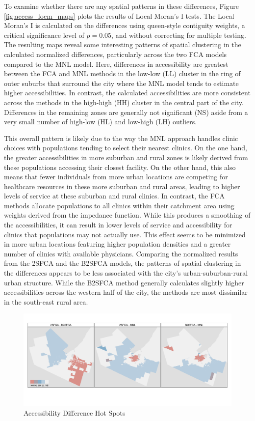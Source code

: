 \documentclass[]{elsarticle} %
\begin{document}
To examine whether there are any spatial patterns in these differences,
Figure \ref{fig:access_locm_maps} plots the results of Local Moran's I
tests. The Local Moran's I is calculated on the differences using
queen-style contiguity weights, a critical significance level of
\(p=0.05\), and without correcting for multiple testing. The resulting
maps reveal some interesting patterns of spatial clustering in the
calculated normalized differences, particularly across the two FCA
models compared to the MNL model. Here, differences in accessibility are
greatest between the FCA and MNL methods in the low-low (LL) cluster in
the ring of outer suburbs that surround the city where the MNL model
tends to estimate higher accessibilities. In contrast, the calculated
accessibilities are more consistent across the methods in the high-high
(HH) cluster in the central part of the city. Differences in the
remaining zones are generally not significant (NS) aside from a very
small number of high-low (HL) and low-high (LH) outliers.

This overall pattern is likely due to the way the MNL approach handles
clinic choices with populations tending to select their nearest clinics.
On the one hand, the greater accessibilities in more suburban and rural
zones is likely derived from these populations accessing their closest
facility. On the other hand, this also means that fewer individuals from
more urban locations are competing for healthcare resources in these
more suburban and rural areas, leading to higher levels of service at
these suburban and rural clinics. In contrast, the FCA methods allocate
populations to all clinics within their catchment area using weights
derived from the impedance function. While this produces a smoothing of
the accessibilities, it can result in lower levels of service and
accessibility for clinics that populations may not actually use. This
effect seems to be minimized in more urban locations featuring higher
population densities and a greater number of clinics with available
physicians. Comparing the normalized results from the 2SFCA and the
B2SFCA models, the patterns of spatial clustering in the differences
appears to be less associated with the city's urban-suburban-rural urban
structure. While the B2SFCA method generally calculates slightly higher
accessibilities across the western half of the city, the methods are
most dissimilar in the south-east rural area.

\begin{figure}
\includegraphics[width=1\linewidth]{./img/access_locm_maps} \caption{\label{fig:access_locm_maps}Accessibility Difference Hot Spots}\label{fig:fig 4}
\end{figure}
\end{document}
